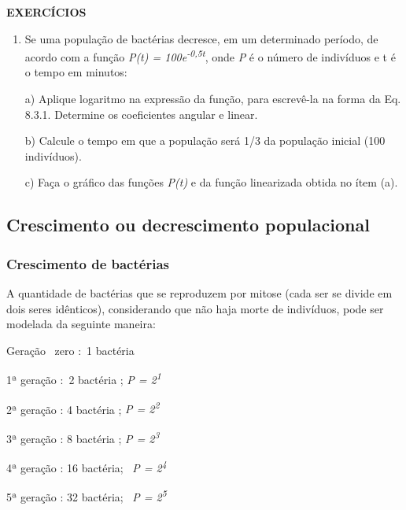 \noindent\textbf{EXERCÍCIOS \thesubsection}
\begin{enumerate}[label=\thesubsection.\arabic*]
    \exitem{} Utilize a ideia de linearização das funções exponenciais para calcular \textit{k\textsubscript{m}} na equação de desvalorização de bens (Eq. 8.2.1).

	\exitem{} Utilize a ideia de linearização das funções exponenciais para calcular~ \textit{t }na equação de desvalorização de bens (Eq. 8.2.1).

	\item Se uma população de bactérias decresce, em um determinado período, de acordo com a função \textit{P(t) = 100e\textsuperscript{-0,5t}}, onde \textit{P} é o número de indivíduos e t é o tempo em minutos:

	a) Aplique logaritmo na expressão da função, para escrevê-la na forma da Eq. 8.3.1. Determine os coeficientes angular e linear.

	b) Calcule o tempo em que a população será 1/3 da população inicial (100 indivíduos).

	c) Faça o gráfico das funções \textit{P(t)} e da função linearizada obtida no ítem (a).
\end{enumerate}

\subsection{Crescimento ou decrescimento populacional}

\subsubsection{Crescimento de bactérias}

A quantidade de bactérias que se reproduzem por mitose (cada ser se divide em dois seres idênticos), considerando que não haja morte de indivíduos, pode ser modelada da seguinte maneira: 

Geração~ zero :~1 bactéria  

1ª geração :~2 bactéria  ; \textit{P = 2\textsuperscript{1}}

2ª geração : 4 bactéria ; \textit{P = 2\textsuperscript{2}}

3ª geração : 8 bactéria ; \textit{P = 2\textsuperscript{3}}

4ª geração : 16 bactéria;~ \textit{P = 2\textsuperscript{4}}

5ª geração : 32 bactéria;~ \textit{P = 2\textsuperscript{5}}

